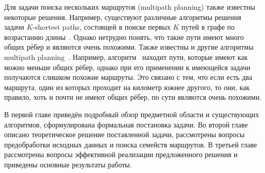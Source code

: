 Для задачи поиска нескольких маршрутов (multipath planning) также
известны некоторые решения. Например, существуют различные алгоритмы
решения задачи $K$-shortest paths, состоящей в поиске первых $K$ путей
в графе по возрастанию длины~\cite{eppstein1998finding,
yen1971finding}. Однако нетрудно понять, что такие пути имеют много
общих рёбер и являются очень похожими. Также известны и другие
алгоритмы multipath planning~\cite{lim2005shortest,
dial1971probabilistic, mafast}. Например,
алгоритм~\cite{lim2005shortest} находит пути, которые имеют как можно
меньше общих рёбер, однако при его применении к имеющейся задачи
получаются слишком похожие маршруты. Это связано с тем, что если есть
два маршрута, один из которых проходит на километр южнее другого, то
они, как правило, хоть и почти не имеют общих рёбер, по сути являются
очень похожими.

В первой главе приведён подробный обзор предметной области и
существующих алгоритмов, сформулирована формальная постановка задачи.
Во второй главе описано теоретическое решение поставленной задачи,
рассмотрены вопросы предобработки исходных данных и поиска семейств
маршрутов. В третьей главе рассмотрены вопросы эффективной реализации
предложенного решения и приведены основные результаты работы.

\FloatBarrier

